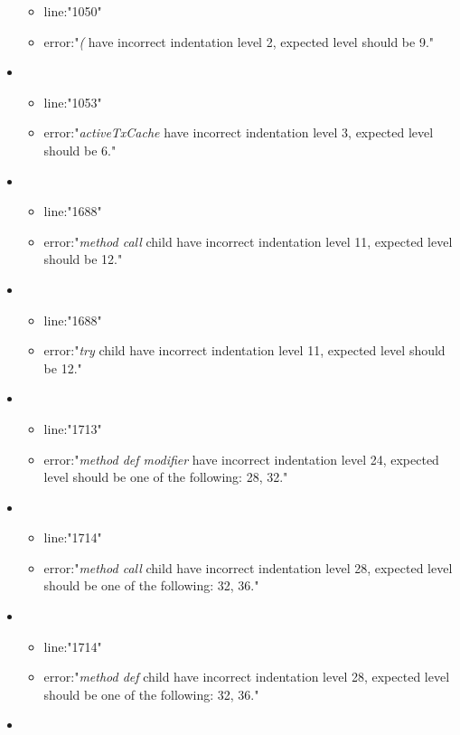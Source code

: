 \begin{itemize}
\begin{itemize}
		\item line:"1050" 
		\item error:"\emph{(} have incorrect indentation level 2, expected level should be 9." 
	\end{itemize}
	\item 
	\begin{itemize} 
		\item line:"1053" 
		\item error:"\emph{activeTxCache} have incorrect indentation level 3, expected level should be 6." 
	\end{itemize}
	\item 
	\begin{itemize} 
		\item line:"1688" 
		\item error:"\emph{method call} child have incorrect indentation level 11, expected level should be 12." 
	\end{itemize}
	\item 
	\begin{itemize} 
		\item line:"1688" 
		\item error:"\emph{try} child have incorrect indentation level 11, expected level should be 12." 
	\end{itemize}
	\item 
	\begin{itemize} 
		\item line:"1713" 
		\item error:"\emph{method def modifier} have incorrect indentation level 24, expected level should be one of the following: 28, 32." 
	\end{itemize}
	\item 
	\begin{itemize} 
		\item line:"1714" 
		\item error:"\emph{method call} child have incorrect indentation level 28, expected level should be one of the following: 32, 36." 
	\end{itemize}
	\item 
	\begin{itemize} 
		\item line:"1714" 
		\item error:"\emph{method def} child have incorrect indentation level 28, expected level should be one of the following: 32, 36." 
	\end{itemize}
	\item 
	\begin{itemize} 

\end{itemize}
\end{itemize}
